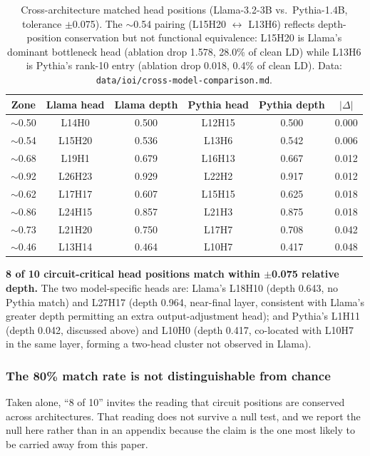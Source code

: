 \documentclass[11pt,a4paper]{article}
\begin{document}
\begin{table}[H]
  \centering
  \caption{Cross-architecture matched head positions (Llama-3.2-3B vs.\ Pythia-1.4B,
    tolerance $\pm$0.075). The $\sim$0.54 pairing (L15H20 $\leftrightarrow$ L13H6)
    reflects depth-position conservation but not functional equivalence: L15H20 is
    Llama's dominant bottleneck head (ablation drop 1.578, 28.0\% of clean LD) while
    L13H6 is Pythia's rank-10 entry (ablation drop 0.018, 0.4\% of clean LD).
    Data: \texttt{data/ioi/cross-model-comparison.md}.}
  \label{tab:cross-arch}
  \smallskip
  \begin{tabular}{cccccc}
    \toprule
    Zone   & Llama head & Llama depth & Pythia head & Pythia depth & $|\Delta|$ \\
    \midrule
    $\sim$0.50 & L14H0  & 0.500 & L12H15 & 0.500 & 0.000 \\
    $\sim$0.54 & L15H20 & 0.536 & L13H6  & 0.542 & 0.006 \\
    $\sim$0.68 & L19H1  & 0.679 & L16H13 & 0.667 & 0.012 \\
    $\sim$0.92 & L26H23 & 0.929 & L22H2  & 0.917 & 0.012 \\
    $\sim$0.62 & L17H17 & 0.607 & L15H15 & 0.625 & 0.018 \\
    $\sim$0.86 & L24H15 & 0.857 & L21H3  & 0.875 & 0.018 \\
    $\sim$0.73 & L21H20 & 0.750 & L17H7  & 0.708 & 0.042 \\
    $\sim$0.46 & L13H14 & 0.464 & L10H7  & 0.417 & 0.048 \\
    \bottomrule
  \end{tabular}
\end{table}

\textbf{8 of 10 circuit-critical head positions match within $\pm$0.075 relative
depth.} The two model-specific heads are: Llama's L18H10 (depth 0.643, no Pythia
match) and L27H17 (depth 0.964, near-final layer, consistent with Llama's greater
depth permitting an extra output-adjustment head); and Pythia's L1H11 (depth 0.042,
discussed above) and L10H0 (depth 0.417, co-located with L10H7 in the same layer,
forming a two-head cluster not observed in Llama).

\subsubsection{The 80\% match rate is not distinguishable from chance}
\label{sec:depth-null}

Taken alone, ``8 of 10'' invites the reading that circuit positions are conserved
across architectures. That reading does not survive a null test, and we report the
null here rather than in an appendix because the claim is the one most likely to be
carried away from this paper.
\end{document}
